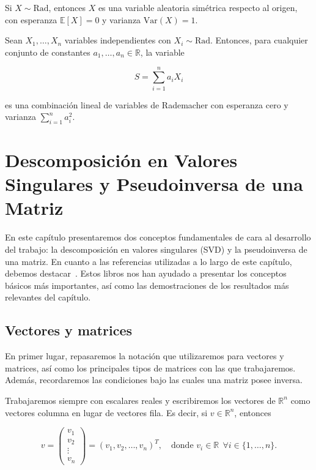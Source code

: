 \begin{proposicion}
    Si $X \sim \text{Rad}$, entonces $X$ es una variable aleatoria simétrica respecto al origen, con esperanza $\mathbb{E}[X] = 0$ y varianza $\text{Var}(X) = 1$.
\end{proposicion}

\begin{proposicion}
    Sean $X_1, \dots, X_n$ variables independientes con $X_i \sim \text{Rad}$. Entonces, para cualquier conjunto de constantes $a_1, \dots, a_n \in \mathbb{R}$, la variable

    \[
        S = \sum_{i=1}^n a_i X_i
    \]

    es una combinación lineal de variables de Rademacher con esperanza cero y varianza $\sum_{i=1}^n a_i^2$.
\end{proposicion}


\chapter{Descomposición en Valores Singulares y Pseudoinversa de una Matriz}\label{ch:descomposicion-valores-singulares-pseudoinversa}

En este capítulo presentaremos dos conceptos fundamentales de cara al desarrollo del trabajo: la descomposición en valores singulares (SVD) y la pseudoinversa de una matriz. En cuanto a las referencias utilizadas a lo largo de este capítulo, debemos destacar~\cite{Friedberg2014linear, Strang2023, Poole2011}. Estos libros nos han ayudado a presentar los conceptos básicos más importantes, así como las demostraciones de los resultados más relevantes del capítulo.

\section{Vectores y matrices}\label{sec:vectores-matrices}

En primer lugar, repasaremos la notación que utilizaremos para vectores y matrices, así como los principales tipos de matrices con las que trabajaremos. Además, recordaremos las condiciones bajo las cuales una matriz posee inversa.

Trabajaremos siempre con escalares reales y escribiremos los vectores de $\mathbb{R}^{n}$ como vectores columna en lugar de vectores fila. Es decir, si $v \in \mathbb{R}^{n}$, entonces

\[ 
    v = \begin{pmatrix} 
        v_{1} \\ 
        v_{2} \\ 
        \vdots \\
        v_{n}
    \end{pmatrix} = {(v_{1}, v_{2}, \ldots, v_{n})}^{T}, \quad \text{donde } v_i \in \mathbb{R} \ \ \forall i \in \{1, \ldots, n \}.
\]

